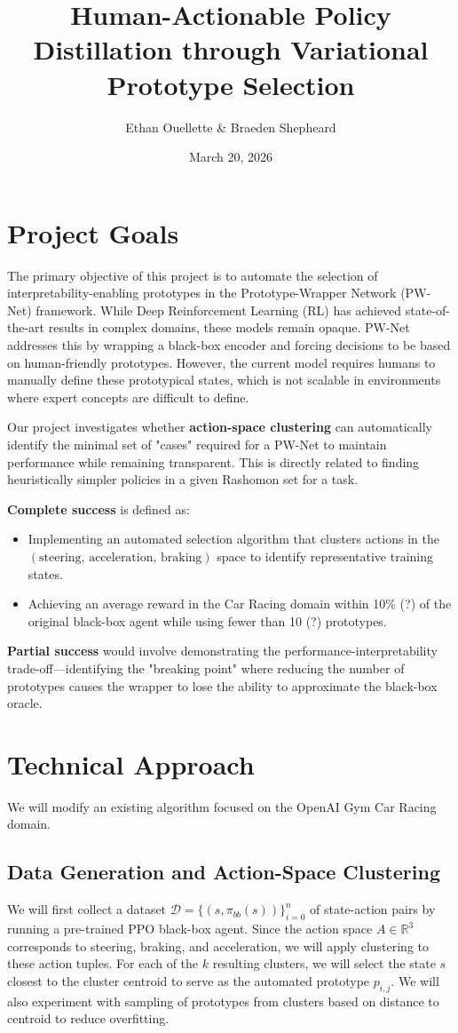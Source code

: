 \documentclass{article} %
\title{Human-Actionable Policy Distillation through Variational Prototype Selection}
\author{Ethan Ouellette \& Braeden Shepheard}
\date{March 20, 2026}
\begin{document}
\maketitle

\section{Project Goals}
The primary objective of this project is to automate the selection of interpretability-enabling prototypes in the Prototype-Wrapper Network (PW-Net) framework. While Deep Reinforcement Learning (RL) has achieved state-of-the-art results in complex domains, these models remain opaque. PW-Net addresses this by wrapping a black-box encoder and forcing decisions to be based on human-friendly prototypes. However, the current model requires humans to manually define these prototypical states, which is not scalable in environments where expert concepts are difficult to define.

Our project investigates whether \textbf{action-space clustering} can automatically identify the minimal set of "cases" required for a PW-Net to maintain performance while remaining transparent. This is directly related to finding heuristically simpler policies in a given Rashomon set for a task.   

\textbf{Complete success} is defined as:
\begin{itemize}
    \item Implementing an automated selection algorithm that clusters actions in the $(\text{steering, acceleration, braking})$ space to identify representative training states.
    \item Achieving an average reward in the Car Racing domain within 10\% (?) of the original black-box agent while using fewer than 10 (?) prototypes.
\end{itemize}

\textbf{Partial success} would involve demonstrating the performance-interpretability trade-off—identifying the "breaking point" where reducing the number of prototypes causes the wrapper to lose the ability to approximate the black-box oracle.

\section{Technical Approach}
We will modify an existing algorithm focused on the OpenAI Gym Car Racing domain.

\subsection{Data Generation and Action-Space Clustering}
We will first collect a dataset $\mathcal{D} = \{(s, \pi_{bb}(s))\}_{i=0}^n$ of state-action pairs by running a pre-trained PPO black-box agent. Since the action space $A \in \mathbb{R}^3$ corresponds to steering, braking, and acceleration, we will apply clustering to these action tuples. For each of the $k$ resulting clusters, we will select the state $s$ closest to the cluster centroid to serve as the automated prototype $p_{i,j}$. We will also experiment with sampling of prototypes from clusters based on distance to centroid to reduce overfitting.
\end{document}
